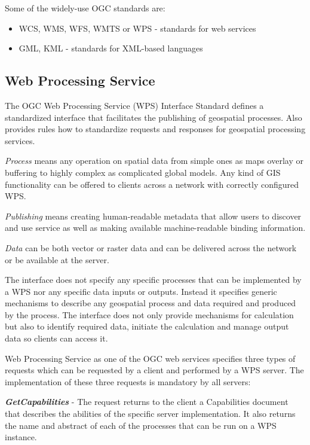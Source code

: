 Some of the widely-use OGC standards are:
\begin{itemize}
\item WCS, WMS, WFS, WMTS or WPS - standards for web services
\item GML, KML - standards for XML-based languages
\end{itemize}


\bigskip
\subsection{Web Processing Service}
The OGC Web Processing Service (WPS) Interface Standard defines a standardized interface
that facilitates the publishing of geospatial processes. Also provides rules how to standardize
requests and responses for geospatial processing services. 

\textit{Process} means any operation on spatial
data from simple ones as maps overlay or buffering to highly complex as complicated global models. Any kind of GIS 
functionality can be offered to clients across a network with correctly configured WPS. 

\textit{Publishing} means
creating human-readable metadata that allow users to discover and use service as well as making 
available machine-readable binding information.

\textit{Data} can be both vector or raster data and can be delivered across the network or be available
at the server.

The interface does not specify any specific processes that can be implemented by a WPS nor any specific
data inputs or outputs. Instead it specifies generic mechanisms to describe any geospatial process and
data required and produced by the process. The interface does not only provide mechanisms for calculation
but also to identify required data, initiate the calculation and manage output data so clients can access it. 

\bigskip
Web Processing Service as one of the OGC web services specifies three types of requests which can be requested
by a client and performed by a WPS server. The implementation of these three requests is mandatory by all servers:

\textbf{\textit{GetCapabilities}} - The request returns to the client a Capabilities document that describes the abilities
of the specific server implementation. It also returns the name and abstract of each of the processes that can
be run on a WPS instance.

